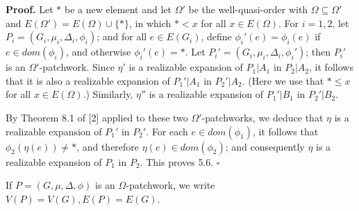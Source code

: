 \textbf{Proof.} Let $*$ be a new element and let $\Omega'$ be the well-quasi-order with $\Omega \subseteq \Omega'$ and $E(\Omega') = E(\Omega) \cup \{*\}$, in which $* < x$ for all $x \in E(\Omega)$. For $i = 1, 2$, let $P_i = (G_i, \mu_i, \Delta_i, \phi_i)$; and for all $e \in E(G_i)$, define $\phi_i'(e) = \phi_i(e)$ if $e \in dom(\phi_i)$, and otherwise $\phi_i'(e) = *$. Let $P_i' = (G_i, \mu_i, \Delta_i, \phi_i')$; then $P_i'$ is an $\Omega'$-patchwork. Since $\eta'$ is a realizable expansion of $P_1|A_1$ in $P_2|A_2$, it follows that it is also a realizable expansion of $P_1'|A_1$ in $P_2'|A_2$. (Here we use that $* \le x$ for all $x \in E(\Omega)$.) Similarly, $\eta''$ is a realizable expansion of $P_1'|B_1$ in $P_2'|B_2$.

By Theorem 8.1 of [2] applied to these two $\Omega'$-patchworks, we deduce that $\eta$ is a realizable expansion of $P_1'$ in $P_2'$. For each $e \in dom(\phi_1)$, it follows that $\phi_2(\eta(e)) \ne *$, and therefore $\eta(e) \in dom(\phi_2)$; and consequently $\eta$ is a realizable expansion of $P_1$ in $P_2$. This proves 5.6. $\square$

If $P = (G, \mu, \Delta, \phi)$ is an $\Omega$-patchwork, we write $V(P) = V(G), E(P) = E(G)$.

